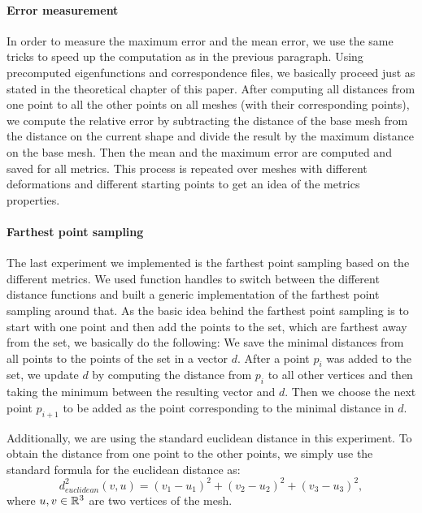 \paragraph{Error measurement}
In order to measure the maximum error and the mean error, we use the same tricks to speed up the computation as in the previous paragraph.
Using precomputed eigenfunctions and correspondence files, we basically proceed just as stated in the theoretical chapter of this paper.
After computing all distances from one point to all the other points on all meshes (with their corresponding points), we compute the relative error by subtracting the distance of the base mesh from the distance on the current shape and divide the result by the maximum distance on the base mesh.
Then the mean and the maximum error are computed and saved for all metrics.
This process is repeated over meshes with different deformations and different starting points to get an idea of the metrics properties.


\paragraph{Farthest point sampling}
The last experiment we implemented is the farthest point sampling based on the different metrics.
We used function handles to switch between the different distance functions and built a generic implementation of the farthest point sampling around that.
As the basic idea behind the farthest point sampling is to start with one point and then add the points to the set, which are farthest away from the set, we basically do the following:
We save the minimal distances from all points to the points of the set in a vector $d$.
After a point $p_i$ was added to the set, we update $d$ by computing the distance from $p_i$ to all other vertices and then taking the minimum between the resulting vector and $d$.
Then we choose the next point $p_{i+1}$ to be added as the point corresponding to the minimal distance in $d$.

Additionally, we are using the standard euclidean distance in this experiment.
To obtain the distance from one point to the other points, we simply use the standard formula for the euclidean distance as:
$$d_{euclidean}^2(v,u) = (v_1 -u_1)^2 + (v_2 - u_2)^2 + (v_3 - u_3)^2,$$
where $u,v\in \mathbb{R}^3$ are two vertices of the mesh.
